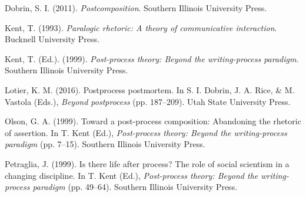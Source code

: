 \documentclass[12pt]{article}
\begin{document}
Dobrin, S. I. (2011). \textit{Postcomposition}. Southern Illinois University Press.

Kent, T. (1993). \textit{Paralogic rhetoric: A theory of communicative interaction}. Bucknell University Press.

Kent, T. (Ed.). (1999). \textit{Post-process theory: Beyond the writing-process paradigm}. Southern Illinois University Press.

Lotier, K. M. (2016). Postprocess postmortem. In S. I. Dobrin, J. A. Rice, \& M. Vastola (Eds.), \textit{Beyond postprocess} (pp. 187--209). Utah State University Press.

Olson, G. A. (1999). Toward a post-process composition: Abandoning the rhetoric of assertion. In T. Kent (Ed.), \textit{Post-process theory: Beyond the writing-process paradigm} (pp. 7--15). Southern Illinois University Press.

Petraglia, J. (1999). Is there life after process? The role of social scientism in a changing discipline. In T. Kent (Ed.), \textit{Post-process theory: Beyond the writing-process paradigm} (pp. 49--64). Southern Illinois University Press.
\end{document}
